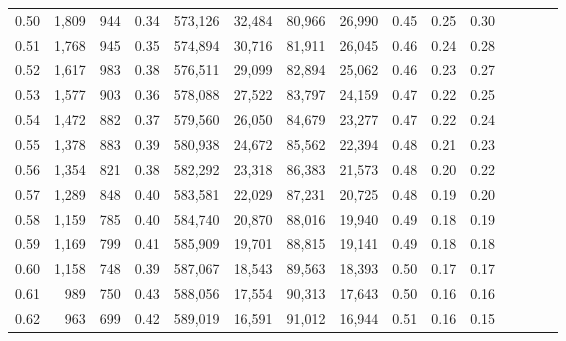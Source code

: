 \begin{tabular}{rrrcrrrrrrrrrrr}
0.50 &   1,809 &    944 &                                       0.34 &  573,126 &   32,484 &   80,966 &   26,990 &  0.45 &  0.25 &                         0.30 \\
0.51 &   1,768 &    945 &                                       0.35 &  574,894 &   30,716 &   81,911 &   26,045 &  0.46 &  0.24 &                         0.28 \\
0.52 &   1,617 &    983 &                                       0.38 &  576,511 &   29,099 &   82,894 &   25,062 &  0.46 &  0.23 &                         0.27 \\
0.53 &   1,577 &    903 &                                       0.36 &  578,088 &   27,522 &   83,797 &   24,159 &  0.47 &  0.22 &                         0.25 \\
0.54 &   1,472 &    882 &                                       0.37 &  579,560 &   26,050 &   84,679 &   23,277 &  0.47 &  0.22 &                         0.24 \\
0.55 &   1,378 &    883 &                                       0.39 &  580,938 &   24,672 &   85,562 &   22,394 &  0.48 &  0.21 &                         0.23 \\
0.56 &   1,354 &    821 &                                       0.38 &  582,292 &   23,318 &   86,383 &   21,573 &  0.48 &  0.20 &                         0.22 \\
0.57 &   1,289 &    848 &                                       0.40 &  583,581 &   22,029 &   87,231 &   20,725 &  0.48 &  0.19 &                         0.20 \\
0.58 &   1,159 &    785 &                                       0.40 &  584,740 &   20,870 &   88,016 &   19,940 &  0.49 &  0.18 &                         0.19 \\
0.59 &   1,169 &    799 &                                       0.41 &  585,909 &   19,701 &   88,815 &   19,141 &  0.49 &  0.18 &                         0.18 \\
0.60 &   1,158 &    748 &                                       0.39 &  587,067 &   18,543 &   89,563 &   18,393 &  0.50 &  0.17 &                         0.17 \\
0.61 &     989 &    750 &                                       0.43 &  588,056 &   17,554 &   90,313 &   17,643 &  0.50 &  0.16 &                         0.16 \\
0.62 &     963 &    699 &                                       0.42 &  589,019 &   16,591 &   91,012 &   16,944 &  0.51 &  0.16 &                         0.15 \\

\end{tabular}
